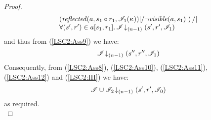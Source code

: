 \begin{lemma}
\begin{proof}
%
\begin{align*}
	\begin{array}{@{} l @{}}
		\left(\m{reflected}(a, s_1 \composeL r_1, \lmod_1(\ca{})) |/ \neg\m{visible}(a, s_1) \ \right) /| \\
		\for{(s', r') \in a[s_1, r_1]} \extendsAMUpto{\lmod}{(n-1)}{s'}{r'}{\lmod_1}
	\end{array}
\end{align*}
and thus from (\ref{LSC2:Ass9}) we have:
%
%
\begin{align}
	\mathscr{I} \!\downarrow_{(n-1)} \left(s'', r'', \mathscr{I}_1\right)
	\label{LSC2:Ass12}
\end{align}
%
Consequently, from (\ref{LSC2:Ass8}), (\ref{LSC2:Ass10}), (\ref{LSC2:Ass11}), (\ref{LSC2:Ass12}) and (\ref{LSC2:IH}) we have: 
%
\begin{align*}
	\mathscr{I} \cup \mathscr{I}_2 \!\downarrow_{(n-1)} \left(s', r', \mathscr{I}_0\right)
\end{align*}
%
as required.\\

%
%
%
%



\end{proof}
\end{lemma}
